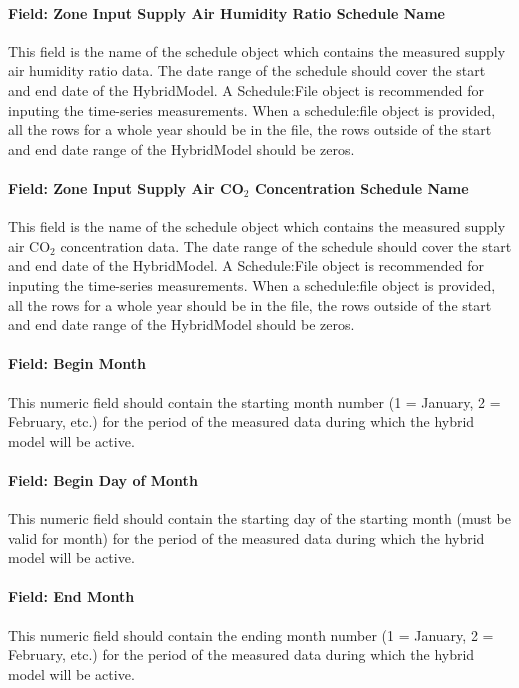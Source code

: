 \paragraph{Field: Zone Input Supply Air Humidity Ratio Schedule Name}\label{field-zone-input-supply-air-humidity-ratio-schedule-name-hm}
This field is the name of the schedule object which contains the measured supply air humidity ratio data. The date range of the schedule should cover the start and end date of the HybridModel. A Schedule:File object is recommended for inputing the time-series measurements. When a schedule:file object is provided, all the rows for a whole year should be in the file, the rows outside of the start and end date range of the HybridModel should be zeros.

\paragraph{Field: Zone Input Supply Air CO$_2$ Concentration Schedule Name}\label{field-zone-input-supply-air-co2-concentration-schedule-name-hm}
This field is the name of the schedule object which contains the measured supply air CO$_2$ concentration data. The date range of the schedule should cover the start and end date of the HybridModel. A Schedule:File object is recommended for inputing the time-series measurements. When a schedule:file object is provided, all the rows for a whole year should be in the file, the rows outside of the start and end date range of the HybridModel should be zeros.

\paragraph{Field: Begin Month}\label{field-begin-month-hm}
This numeric field should contain the starting month number (1 = January, 2 = February, etc.) for the period of the measured data during which the hybrid model will be active.

\paragraph{Field: Begin Day of Month}\label{field-begin-day-of-month-hm}
This numeric field should contain the starting day of the starting month (must be valid for month) for the period of the measured data during which the hybrid model will be active.

\paragraph{Field: End Month}\label{field-end-month-hm}
This numeric field should contain the ending month number (1 = January, 2 = February, etc.) for the period of the measured data during which the hybrid model will be active.


